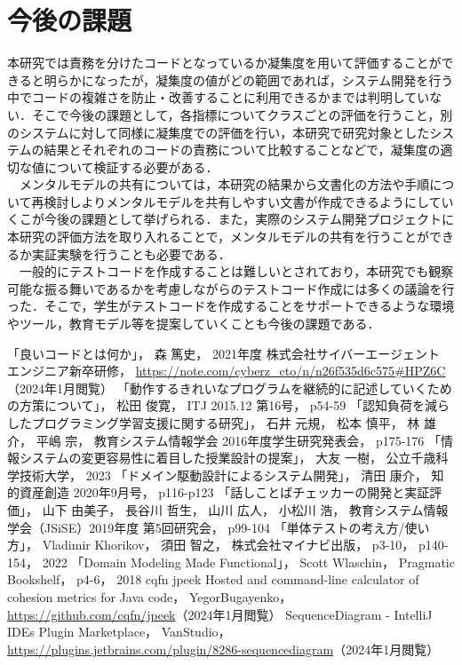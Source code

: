 \documentclass[12pt, a4paper]{jreport}
\begin{document}
\section{今後の課題}
本研究では責務を分けたコードとなっているか凝集度を用いて評価することができると明らかになったが，凝集度の値がどの範囲であれば，システム開発を行う中でコードの複雑さを防止・改善することに利用できるかまでは判明していない．そこで今後の課題として，各指標についてクラスごとの評価を行うこと，別のシステムに対して同様に凝集度での評価を行い，本研究で研究対象としたシステムの結果とそれぞれのコードの責務について比較することなどで，凝集度の適切な値について検証する必要がある．
\\　メンタルモデルの共有については，本研究の結果から文書化の方法や手順について再検討しよりメンタルモデルを共有しやすい文書が作成できるようにしていくこが今後の課題として挙げられる．また，実際のシステム開発プロジェクトに本研究の評価方法を取り入れることで，メンタルモデルの共有を行うことができるか実証実験を行うことも必要である．
\\　一般的にテストコードを作成することは難しいとされており，本研究でも観察可能な振る舞いであるかを考慮しながらのテストコード作成には多くの議論を行った．そこで，学生がテストコードを作成することをサポートできるような環境やツール，教育モデル等を提案していくことも今後の課題である．
\renewcommand{\bibname}{参考文献}
\begin{thebibliography}{20}
「良いコードとは何か」， 森 篤史， 2021年度 株式会社サイバーエージェント エンジニア新卒研修，
\url{https://note.com/cyberz_cto/n/n26f535d6c575#HPZ6C}（2024年1月閲覧）
「動作するきれいなプログラムを継続的に記述していくための方策について」， 松田 俊寛， ITJ 2015.12 第16号， p54-59
「認知負荷を減らしたプログラミング学習支援に関する研究」， 石井 元規， 松本 慎平， 林 雄介， 平嶋 宗， 教育システム情報学会 2016年度学生研究発表会， p175-176
「情報システムの変更容易性に着目した授業設計の提案」， 大友 一樹， 公立千歳科学技術大学， 2023
「ドメイン駆動設計によるシステム開発」， 清田 康介， 知的資産創造 2020年9月号， p116-p123
「話しことばチェッカーの開発と実証評価」， 山下 由美子， 長谷川 哲生， 山川 広人， 小松川 浩， 教育システム情報学会（JSiSE）2019年度 第5回研究会， p99-104
「単体テストの考え方/使い方」， Vladimir Khorikov， 須田 智之， 株式会社マイナビ出版， p3-10， p140-154， 2022
「Domain Modeling Made Functional」， Scott Wlaschin， Pragmatic Bookshelf， p4-6， 2018
cqfn jpeek Hosted and command-line calculator of cohesion metrics for Java code， YegorBugayenko，
\url{https://github.com/cqfn/jpeek}（2024年1月閲覧）
SequenceDiagram - IntelliJ IDEs Plugin Marketplace， VanStudio，
\url{https://plugins.jetbrains.com/plugin/8286-sequencediagram}（2024年1月閲覧）
\end{thebibliography}
\end{document}

